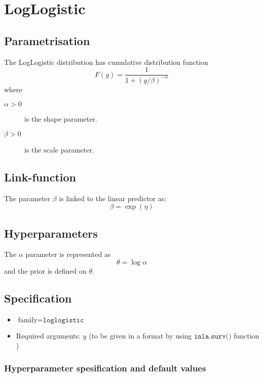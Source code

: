 \documentclass[a4paper,11pt]{article}
\begin{document}
\section*{LogLogistic}

\subsection*{Parametrisation}

The LogLogistic distribution has cumulative distribution function
\begin{displaymath}
    F(y) = \frac{1}{1 + (y/\beta)^{-\alpha}}
\end{displaymath}
where
\begin{description}
\item[$\alpha > 0$] is the shape parameter.
\item[$\beta > 0$] is the scale parameter.
\end{description}

\subsection*{Link-function}

The parameter $\beta$ is linked to the linear predictor as:
\[
\beta = \exp(\eta)
\]
\subsection*{Hyperparameters}

The $\alpha$ parameter is represented as
\[
\theta = \log\alpha
\]
and the prior is defined on $\theta$.

\subsection*{Specification}

\begin{itemize}
\item $\text{family}=\texttt{loglogistic}$
\item Required arguments: $y$ (to be given in a format by using
    $\texttt{inla.surv()}$ function )
\end{itemize}

\subsubsection*{Hyperparameter spesification and default values}

\end{document}

